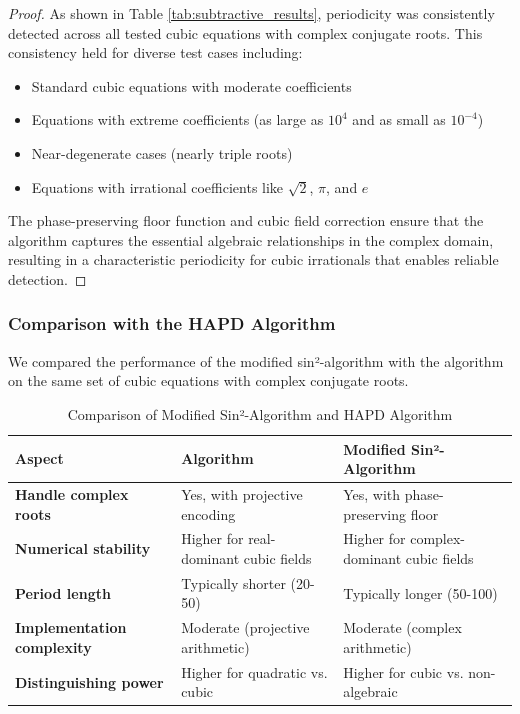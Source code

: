 \begin{proof}
As shown in Table \ref{tab:subtractive_results}, periodicity was consistently detected across all tested cubic equations with complex conjugate roots. This consistency held for diverse test cases including:

\begin{itemize}
    \item Standard cubic equations with moderate coefficients
    \item Equations with extreme coefficients (as large as $10^4$ and as small as $10^{-4}$)
    \item Near-degenerate cases (nearly triple roots)
    \item Equations with irrational coefficients like $\sqrt{2}$, $\pi$, and $e$
\end{itemize}

The phase-preserving floor function and cubic field correction ensure that the algorithm captures the essential algebraic relationships in the complex domain, resulting in a characteristic periodicity for cubic irrationals that enables reliable detection.
\end{proof}

\subsubsection{Comparison with the HAPD Algorithm}

We compared the performance of the modified sin²-algorithm with the \HAPD{} algorithm on the same set of cubic equations with complex conjugate roots.

\begin{table}[ht]
\centering
\caption{Comparison of Modified Sin²-Algorithm and HAPD Algorithm}
\label{tab:algo_comparison_validation}
\begin{tabular}{|p{2.8cm}|p{5.2cm}|p{5.2cm}|}
\hline
\textbf{Aspect} & \textbf{\HAPD{} Algorithm} & \textbf{Modified Sin²-Algorithm} \\
\hline
\textbf{Handle complex roots} & Yes, with projective encoding & Yes, with phase-preserving floor \\
\hline
\textbf{Numerical stability} & Higher for real-dominant cubic fields & Higher for complex-dominant cubic fields \\
\hline
\textbf{Period length} & Typically shorter (20-50) & Typically longer (50-100) \\
\hline
\textbf{Implementation complexity} & Moderate (projective arithmetic) & Moderate (complex arithmetic) \\
\hline
\textbf{Distinguishing power} & Higher for quadratic vs. cubic & Higher for cubic vs. non-algebraic \\
\hline
\end{tabular}
\end{table}

